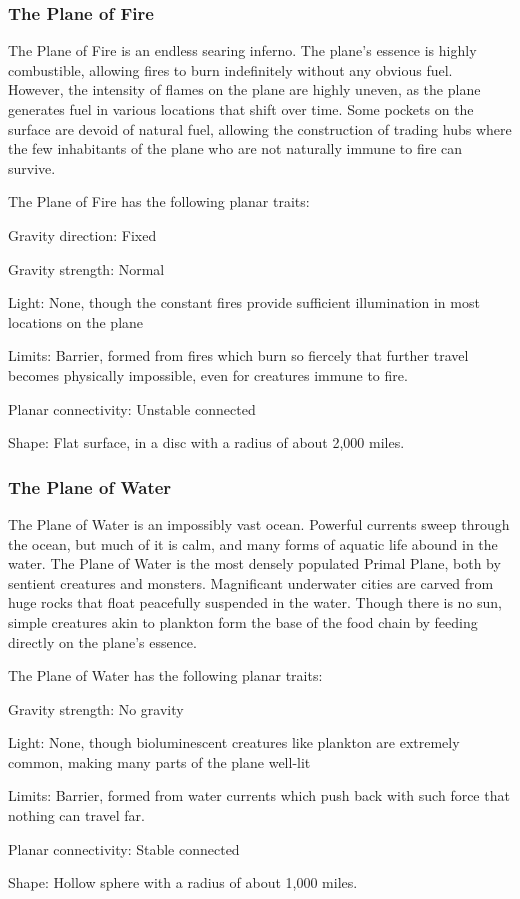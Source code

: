     \subsubsection{The Plane of Fire}
      The Plane of Fire is an endless searing inferno.
      The plane's essence is highly combustible, allowing fires to burn indefinitely without any obvious fuel.
      However, the intensity of flames on the plane are highly uneven, as the plane generates fuel in various locations that shift over time.
      Some pockets on the surface are devoid of natural fuel, allowing the construction of trading hubs where the few inhabitants of the plane who are not naturally immune to fire can survive.

      The Plane of Fire has the following planar traits:
      \begin{raggeditemize}
        \item Gravity direction: Fixed
        \item Gravity strength: Normal
        \item Light: None, though the constant fires provide sufficient illumination in most locations on the plane
        \item Limits: Barrier, formed from fires which burn so fiercely that further travel becomes physically impossible, even for creatures immune to fire.
        \item Planar connectivity: Unstable connected
        \item Shape: Flat surface, in a disc with a radius of about 2,000 miles.
      \end{raggeditemize}

    \subsubsection{The Plane of Water}
      The Plane of Water is an impossibly vast ocean.
      Powerful currents sweep through the ocean, but much of it is calm, and many forms of aquatic life abound in the water.
      The Plane of Water is the most densely populated Primal Plane, both by sentient creatures and monsters.
      Magnificant underwater cities are carved from huge rocks that float peacefully suspended in the water.
      Though there is no sun, simple creatures akin to plankton form the base of the food chain by feeding directly on the plane's essence.

      The Plane of Water has the following planar traits:
      \begin{raggeditemize}
        \item Gravity strength: No gravity
        \item Light: None, though bioluminescent creatures like plankton are extremely common, making many parts of the plane well-lit
        \item Limits: Barrier, formed from water currents which push back with such force that nothing can travel far.
        \item Planar connectivity: Stable connected
        \item Shape: Hollow sphere with a radius of about 1,000 miles.
      \end{raggeditemize}

